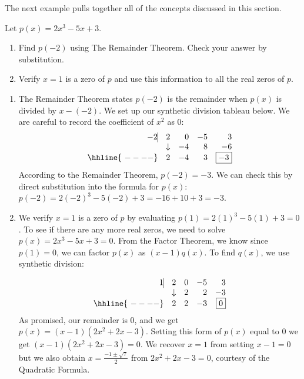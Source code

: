 \documentclass{ximera}
\begin{document}
The next example pulls together all of the concepts discussed in this section.  

\begin{example} 
    Let $p(x) = 2x^3-5x+3$.
    \begin{enumerate}
        \item  Find $p(-2)$ using The Remainder Theorem.  Check your answer by substitution.
        \item  Verify  $x=1$ is a zero of $p$ and use this information to all the real zeros of $p$.
    \end{enumerate}
\end{example}

\begin{exampleSol}
    \begin{enumerate}
        \item  The Remainder Theorem states $p(-2)$ is the remainder when $p(x)$ is divided by $x-(-2)$.  We set up our synthetic division tableau below.  We are careful to record the coefficient of $x^2$ as $0$:
        \[
            \begin{array}{rrrrr}
                -2   \vline& 2 & 0 & -5  & 3 \\
                & \downarrow &  -4  &  8  & -6 \\ \hhline{~----} 
                & 2  &   -4  & 3 &  \fbox{$-3$}  \\  
            \end{array}
        \]
        According to the Remainder Theorem, $p(-2) = -3$.  We can check this by direct substitution into the formula for $p(x)$:  $p(-2) = 2(-2)^3-5(-2)+3 = -16+10+3=-3$.
        
        \item We verify $x=1$ is a zero of $p$ by evaluating $p(1) = 2(1)^3-5(1)+3 = 0$.  To see if there are any more real zeros, we need to solve $p(x) = 2x^3-5x+3 = 0$.  From the Factor Theorem, we know since $p(1) = 0$,  we can factor $p(x)$ as $(x-1)q(x)$.  To find $q(x)$, we use synthetic division:
            
            \[
                \begin{array}{rrrrr}
                    1   \vline& 2 & 0 & -5  & 3 \\
                    & \downarrow &  2  &  2  & -3 \\ \hhline{~----} 
                    & 2  &   2  & -3 &  \fbox{$0$}  \\  
                \end{array}
            \]
            As promised, our remainder is $0$, and we get  $p(x) = (x-1)\left( 2x^2 + 2x - 3\right)$.  Setting this form of $p(x)$ equal to  $0$ we get $(x-1)\left( 2x^2 + 2x - 3\right) = 0$.  We recover  $x = 1$ from setting $x-1=0$  but we also obtain $x = \frac{-1 \pm \sqrt{7}}{2}$ from  $2x^2 + 2x - 3=0$, courtesy of the Quadratic Formula.  
    \end{enumerate}
\end{exampleSol}
\end{document}
